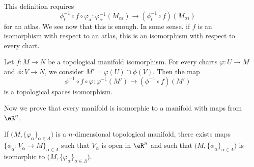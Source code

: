 This definition requires
\begin{equation}
	\phi_i^{-1}\circ f\circ \varphi_{\alpha} \colon \varphi_{\alpha}^{-1}(M_{\alpha i})\to(\phi_i^{-1}\circ f)(M_{\alpha i})
\end{equation}
for an atlas. We see now that this is enough. In some sense, if \( f\) is an isomorphism with respect to an atlas, this is an isomorphism with respect to every chart.

\begin{proposition}	\label{PROPooNOZNooZFYOwK}
	Let \(f \colon M\to N  \) be a topological manifold isomorphism. For every charts \(\varphi \colon U\to M  \) and \(\phi \colon V\to N  \), we consider \( M'=\varphi(U)\cap \phi(V)\). Then the map
	\begin{equation}
		\phi^{-1}\circ f\circ\varphi \colon \varphi^{-1}(M')\to (\phi^{-1}\circ f)(M')
	\end{equation}
	is a topological spaces isomorphism.
\end{proposition}

Now we prove that every manifold is isomorphic to a manifold with maps from \( \eR^n\).
\begin{proposition}	\label{PROPooNVVSooAVVLOM}
	If \( \big( M,\{ \varphi_{\alpha} \}_{\alpha\in \Lambda} \big)\) is a \( n\)-dimensional topological manifold, there exists maps \( \{\phi_{\alpha} \colon V_{\alpha}\to M   \}_{\alpha\in\Lambda}\) such that \( V_{\alpha}\) is open in \( \eR^n\) and such that \( \big( M,\{ \phi_{\alpha} \}_{\alpha\in \Lambda} \big)\) is isomorphic to \( \big( M,\{ \varphi_{\alpha} \}_{\alpha\in\Lambda} \big)\).
\end{proposition}

